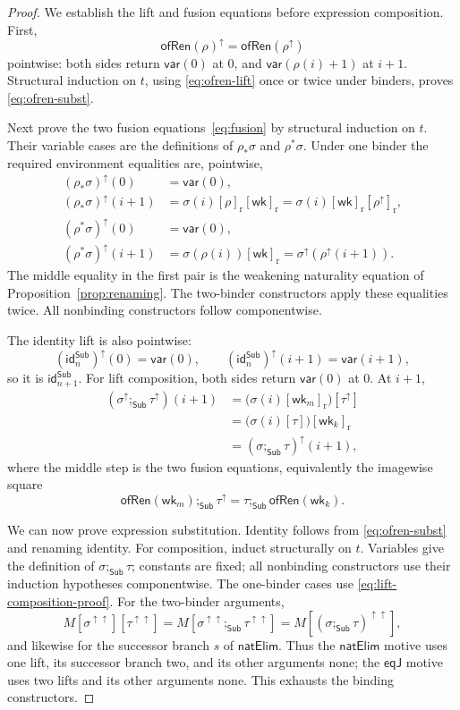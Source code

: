 \documentclass[10pt,reqno]{amsart}
\newcommand{\Sub}{\mathsf{Sub}}
\newcommand{\Var}{\mathsf{var}}
\newcommand{\NatElim}{\mathsf{natElim}}
\newcommand{\EqJ}{\mathsf{eqJ}}
\newcommand{\idren}{\mathsf{id}}
\newcommand{\wk}{\mathsf{wk}}
\newcommand{\lift}{\uparrow}
\begin{document}
\begin{proof}
We establish the lift and fusion equations before expression composition.
First,
\[
 \mathsf{ofRen}(\rho)^\lift=\mathsf{ofRen}(\rho^\lift)
\tag{4.9}\label{eq:ofren-lift}
\]
pointwise: both sides return \(\Var(0)\) at \(0\), and
\(\Var(\rho(i)+1)\) at \(i+1\).  Structural induction on \(t\), using
\eqref{eq:ofren-lift} once or twice under binders, proves
\eqref{eq:ofren-subst}.

Next prove the two fusion equations~\eqref{eq:fusion} by structural induction
on \(t\).  Their variable cases are the definitions of
\(\rho_\ast\sigma\) and \(\rho^\ast\sigma\).  Under one binder the required
environment equalities are, pointwise,
\[
\begin{aligned}
(\rho_\ast\sigma)^\lift(0)&=\Var(0),\\
(\rho_\ast\sigma)^\lift(i+1)
 &=\sigma(i)[\rho]_{\mathrm r}[\wk]_{\mathrm r}
  =\sigma(i)[\wk]_{\mathrm r}[\rho^\lift]_{\mathrm r},\\
(\rho^\ast\sigma)^\lift(0)&=\Var(0),\\
(\rho^\ast\sigma)^\lift(i+1)
 &=\sigma(\rho(i))[\wk]_{\mathrm r}
  =\sigma^\lift(\rho^\lift(i+1)).
\end{aligned}
\]
The middle equality in the first pair is the weakening naturality equation
of Proposition~\ref{prop:renaming}.  The two-binder constructors apply these
equalities twice.  All nonbinding constructors follow componentwise.

The identity lift is also pointwise:
\[
(\idren^{\Sub}_n)^\lift(0)=\Var(0),\qquad
(\idren^{\Sub}_n)^\lift(i+1)=\Var(i+1),
\]
so it is \(\idren^{\Sub}_{n+1}\).
For lift composition, both sides return \(\Var(0)\) at \(0\).  At \(i+1\),
\[
\begin{aligned}
(\sigma^\lift;_{\Sub}\tau^\lift)(i+1)
 &=\bigl(\sigma(i)[\wk_m]_{\mathrm r}\bigr)[\tau^\lift]\\
 &=\bigl(\sigma(i)[\tau]\bigr)[\wk_k]_{\mathrm r}\\
 &=(\sigma;_{\Sub}\tau)^\lift(i+1),
\end{aligned}
\tag{4.10}\label{eq:lift-composition-proof}
\]
where the middle step is the two fusion equations, equivalently the
imagewise square
\[
 \mathsf{ofRen}(\wk_m);_{\Sub}\tau^\lift
 =\tau;_{\Sub}\mathsf{ofRen}(\wk_k).
\]

We can now prove expression substitution.  Identity follows from
\eqref{eq:ofren-subst} and renaming identity.  For composition, induct
structurally on \(t\).  Variables give the definition of
\(\sigma;_{\Sub}\tau\); constants are fixed; all nonbinding constructors
use their induction hypotheses componentwise.  The one-binder cases use
\eqref{eq:lift-composition-proof}.  For the two-binder arguments,
\[
 M[\sigma^{\lift\lift}][\tau^{\lift\lift}]
  =M[\sigma^{\lift\lift};_{\Sub}\tau^{\lift\lift}]
  =M[(\sigma;_{\Sub}\tau)^{\lift\lift}],
\tag{4.11}\label{eq:eqj-double-lift-composition}
\]
and likewise for the successor branch \(s\) of \(\NatElim\).
Thus the \(\NatElim\) motive uses one lift, its successor branch two, and its
other arguments none; the \(\EqJ\) motive uses two lifts and its other
arguments none.  This exhausts the binding constructors.


\end{proof}
\end{document}
